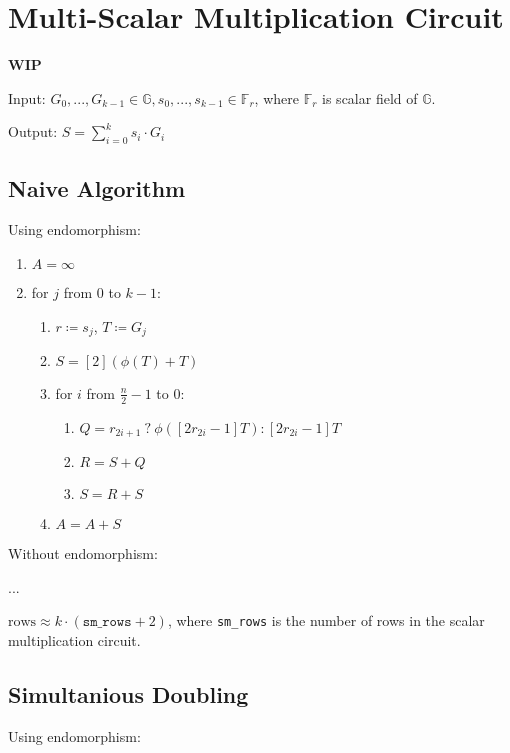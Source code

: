 \section{Multi-Scalar Multiplication Circuit}
\label{section:msm}
\textbf{WIP}

Input: $G_0, ..., G_{k - 1} \in \mathbb{G}, s_0, ..., s_{k - 1} \in \mathbb{F}_r$, where $\mathbb{F}_r$ is scalar field of $\mathbb{G}$.


Output: $S = \sum\limits_{i = 0}^{k}s_i \cdot G_i$

\subsection{Naive Algorithm}
Using endomorphism: 

\begin{enumerate}
	\item $A = \infty$
	\item for $j$ from $0$ to $k-1$:
	\begin{enumerate}
		\item $r \coloneqq s_j$, $T \coloneqq G_j$
		\item $S = [2](\phi(T) + T)$
		\item for $i$ from $\frac{n}{2} - 1$ to $0$:
		\begin{enumerate}
			\item $Q = r_{2i + 1} \: ? \: \phi([2r_{2i} - 1]T) : [2r_{2i} - 1]T$
			\item $R = S + Q$
			\item $S = R + S$
		\end{enumerate}
		\item $A = A + S$
	\end{enumerate}
\end{enumerate}

Without endomorphism: 

...


$\text{rows} \approx k \cdot (\texttt{sm\_rows} + 2)$, where \texttt{sm\_rows} is the number of rows in the scalar multiplication circuit. 

\subsection{Simultanious Doubling}
Using endomorphism: 

